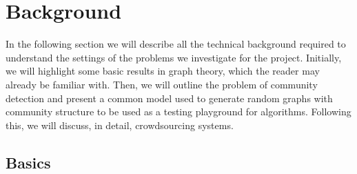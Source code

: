 \documentclass[12pt]{article}
\numberwithin{equation}{section}
\begin{document}

\newpage
\thispagestyle{plain}
\mbox{}
\section {Background}
\label{sec:background}

In the following section we will describe all the technical background required to understand the settings of the problems we investigate for the project. Initially, we will highlight some basic results in graph theory, which the reader may already be familiar with. Then, we will outline the problem of community detection and present a common model used to generate random graphs with community structure to be used as a testing playground for algorithms. Following this, we will discuss, in detail, crowdsourcing systems.

\subsection{Basics}
\label{sec:background;subsec:basics}
\end{document}
